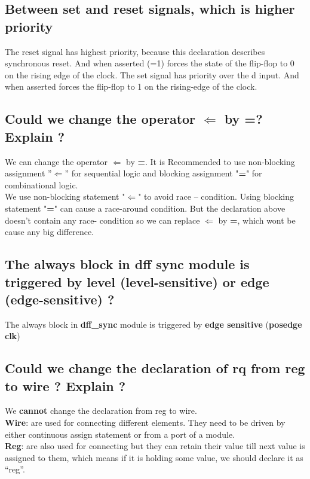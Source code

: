 \documentclass [12pt] {article}
\begin{document}
		\subsection {Between set and reset signals, which is higher priority}
		The reset signal has highest priority, because this declaration describes synchronous reset. And when asserted (=1) forces the state of the flip-flop to 0 on the rising edge of the clock. 
The set signal has priority over the d input. And when asserted forces the flip-flop to 1 on the rising-edge of the clock.

		\subsection {Could we change the operator $\Leftarrow$ by \textbf{=}? Explain ?}
		We can change the operator $\Leftarrow$ by \textbf{=}. It is Recommended to use non-blocking assignment ''$\Leftarrow$'' for sequential logic and blocking assignment "\textbf{=}" for combinational logic. \\
		We use non-blocking statement "$\Leftarrow$" to avoid race – condition. Using blocking statement "\textbf{=}" can cause a race-around condition. But the declaration above doesn’t contain any race- condition so we can replace $\Leftarrow$ by \textbf{=}, which wont be cause any big difference. 
		
		\subsection {The always block in dff sync module is triggered by level (level-sensitive) or edge (edge-sensitive) ?}
		The always block in \textbf{dff\_sync} module is triggered by \textbf{edge sensitive} (\textbf{posedge clk})
		
		\subsection{Could we change the declaration of \textbf{rq} from \textbf{reg} to \textbf{wire} ? Explain ?}
		We \textbf{cannot} change the declaration from reg to wire.\\
		\textbf{Wire}: are used for connecting different elements. They need to be driven by either continuous assign statement or from a port of a module.\\
		\textbf{Reg}: are also used for connecting but they can retain their value till next value is assigned to them, which means if it is holding some value, we should declare it as “reg”.
		
\end{document}
